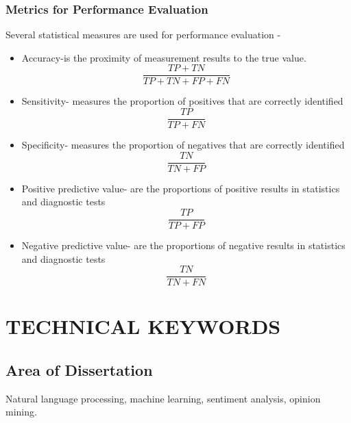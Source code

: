 \documentclass[oneside,a4paper,12pt]{pictreport}
\begin{document}
\subsection{Metrics for Performance Evaluation}
Several statistical measures are used for performance evaluation - 
\begin{itemize}
\item Accuracy-is the proximity of measurement results to the true value.
\begin{equation}
\frac{TP + TN}{TP + TN + FP + FN}
\end{equation}
\item Sensitivity- measures the proportion of positives that are correctly identified
\begin{equation}
\frac{TP}{TP + FN}
\end{equation}
\item Specificity- measures the proportion of negatives that are correctly identified 
\begin{equation}
\frac{TN}{TN + FP}
\end{equation}
\item Positive predictive value- are the proportions of positive results in statistics and diagnostic tests 
\begin{equation}
\frac{TP}{TP + FP}
\end{equation}
\item Negative predictive value- are the proportions of negative results in statistics and diagnostic tests 
\begin{equation}
\frac{TN}{TN + FN}
\end{equation}
\end{itemize}

\chapter{TECHNICAL KEYWORDS}
\section{Area of Dissertation}
Natural language processing, machine learning, sentiment analysis, opinion mining.
\end{document}
